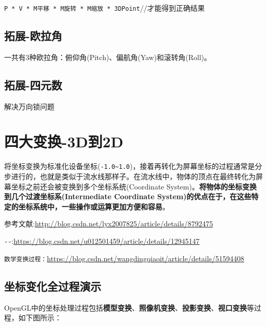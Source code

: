 \documentclass[UTF8,a4paper,12pt]{ctexbook}
\begin{document}
		\verb|P * V * M平移 * M旋转 * M缩放 * 3DPoint|//才能得到正确结果
		
	
	
	\section{拓展-欧拉角}	
		一共有3种欧拉角：俯仰角(Pitch)、偏航角(Yaw)和滚转角(Roll)。
	
	
	\section{拓展-四元数}
		解决万向锁问题
		
		
		
\chapter{四大变换-3D到2D}
	
	将坐标变换为标准化设备坐标(\verb|-1.0~1.0|)，接着再转化为屏幕坐标的过程通常是分步进行的，也就是类似于流水线那样子。在流水线中，物体的顶点在最终转化为屏幕坐标之前还会被变换到多个坐标系统(Coordinate System)。\textbf{将物体的坐标变换到几个过渡坐标系(Intermediate Coordinate System)的优点在于，在这些特定的坐标系统中，一些操作或运算更加方便和容易}。
	
	参考文献:\url{http://blog.csdn.net/lyx2007825/article/details/8792475}
	
	\verb|--|:\url{https://blog.csdn.net/u012501459/article/details/12945147}
	
	\verb|数学变换过程：|\url{https://blog.csdn.net/wangdingqiaoit/article/details/51594408}
		
	
	\newpage
	\section{坐标变化全过程演示}
		OpenGL中的坐标处理过程包括\textbf{模型变换}、\textbf{照像机变换}、\textbf{投影变换}、\textbf{视口变换}等过程，如下图所示：
		
\end{document}
